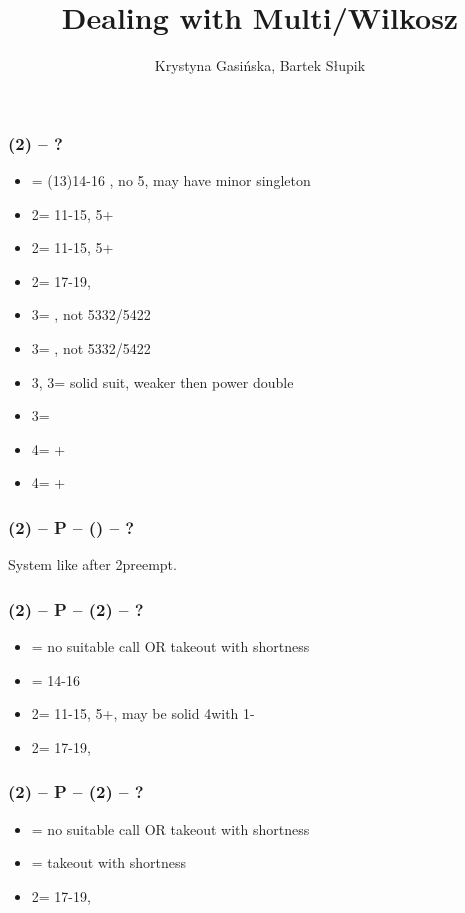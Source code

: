 \documentclass[12pt, a4paper]{article}
\title{Dealing with Multi/Wilkosz}
\author{Krystyna Gasińska, Bartek Słupik}
\begin{document}
\maketitle


\subsubsection*{(2\diams) -- ?}
\begin{itemize}
    \item \dbl = (13)14-16 \bal, no 5\majs, may have minor singleton \vimp
    \item 2\hearts = 11-15, 5+\hearts
    \item 2\spades = 11-15, 5+\spades
    \item 2\nt = 17-19, \bal
    \item 3\clubs = \clubs, not 5332/5422
    \item 3\diams = \diams, not 5332/5422
    \item 3\hearts, 3\spades = solid suit, weaker then power double
    \item 3\nt = \minor \vimp
    \item 4\clubs = \clubs+\major
    \item 4\diams = \diams+\major
\end{itemize}

\subsubsection*{(2\diams) -- P -- () -- ?}
System like after 2\diams preempt.

\subsubsection*{(2\diams) -- P -- (2\hearts) -- ?}
\begin{itemize}
    \item \pass = no suitable call OR takeout with \spades shortness
    \item \dbl = 14-16 \bal \vimp
    \item 2\spades = 11-15, 5+\spades, may be solid 4\spades with 1-\hearts
    \item 2\nt = 17-19, \bal
\end{itemize}

\subsubsection*{(2\diams) -- P -- (2\spades) -- ?}
\begin{itemize}
    \item \pass = no suitable call OR takeout with \hearts shortness \imp
    \item \dbl = takeout with \spades shortness \imp
    \item 2\nt = 17-19, \bal
\end{itemize}
\end{document}
